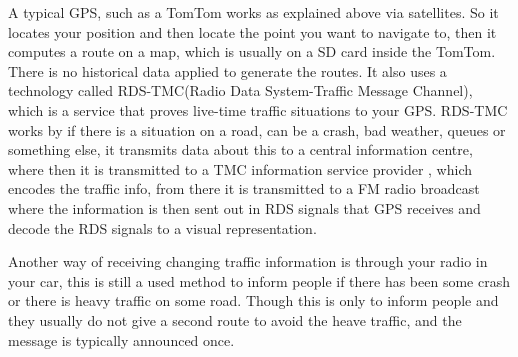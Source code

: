 A typical GPS, such as a TomTom works as explained above via satellites. So it locates your position and then locate the point you want to navigate to, then it computes a route on a map, which is usually on a SD card inside the TomTom. There is no historical data applied to generate the routes.
It also uses a technology called RDS-TMC(Radio Data System-Traffic Message Channel), which is a service that proves live-time traffic situations to your GPS. RDS-TMC works by if there is a situation on a road, can be a crash, bad weather, queues or something else, it transmits data about this to a central information centre, where then it is transmitted to a TMC information service provider	, which encodes the traffic info, from there it is transmitted to a FM radio broadcast where the information is then sent out in RDS signals that GPS receives and decode the RDS signals to a visual representation.

Another way of receiving changing traffic information is through your radio in your car, this is still a used method to inform people if there has been some crash or there is heavy traffic on some road. Though this is only to inform people and they usually do not give a second route to avoid the heave traffic, and the message is typically announced once.
